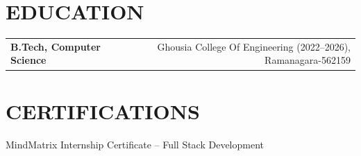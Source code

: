 \documentclass[10pt,a4paper]{article}
\begin{document}
\section*{EDUCATION}

\begin{tabularx}{\textwidth}{Xr}
\textbf{B.Tech, Computer Science}
&
Ghousia College Of Engineering (2022--2026), Ramanagara-562159
\end{tabularx}


\section*{CERTIFICATIONS}

MindMatrix Internship Certificate -- Full Stack Development
\end{document}
